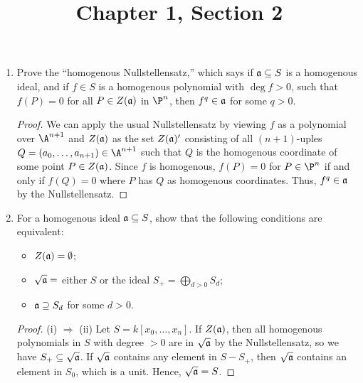 \documentclass[a4paper]{article}
\title{Chapter 1, Section 2}
\begin{document}
\maketitle

\begin{enumerate} [label=\textbf{\arabic*.}, leftmargin=0cm]

    \item[\textbf{1.}] Prove the ``homogenous Nullstellensatz,'' which says if $\mathfrak{a} \subseteq S$ is a homogenous ideal, and if $f \in S$ is a homogenous polynomial with $\deg{f} > 0$, such that $f(P) = 0$ for all $P \in Z(\mathfrak{a})$ in $\P^n$, then $f^q \in \mathfrak{a}$ for some $q > 0$.

          \begin{proof}
              We can apply the usual Nullstellensatz by viewing $f$ as a polynomial over $\A^{n + 1}$ and $Z(\mathfrak{a})$ as the set $Z(\mathfrak{a})'$ consisting of all $(n + 1)$-uples $Q = (a_0, \dots, a_{n + 1}) \in \A^{n + 1}$ such that $Q$ is the homogenous coordinate of some point $P \in Z(\mathfrak{a})$.
              Since $f$ is homogenous, $f(P) = 0$ for $P \in \P^n$ if and only if $f(Q) = 0$ where $P$ has $Q$ as homogenous coordinates.
              Thus, $f^q \in \mathfrak{a}$ by the Nullstellensatz.
          \end{proof}

    \item[\textbf{2.}] For a homogenous ideal $\mathfrak{a} \subseteq S$, show that the following conditions are equivalent:
          \begin{itemize}
              \item[(i)] $Z(\mathfrak{a}) = \emptyset$;

              \item[(ii)] $\sqrt{\mathfrak{a}} =$ either $S$ or the ideal $S_+ = \bigoplus_{d > 0} S_d$;

              \item[(iii)] $\mathfrak{a} \supseteq S_d$ for some $d > 0$.
          \end{itemize}

          \begin{proof}
              (i) $\Rightarrow$ (ii) Let $S = k[x_0, \dots, x_n]$.
              If $Z(\goth{a}) \empty$, then all homogenous polynomials in $S$ with degree $> 0$ are in $\sqrt{\mathfrak{a}}$ by the Nullstellensatz, so we have $S_+ \subseteq \sqrt{\mathfrak{a}}$.
              If $\sqrt{\mathfrak{a}}$ contains any element in $S - S_+$, then $\sqrt{\mathfrak{a}}$ contains an element in $S_0$, which is a unit.
              Hence, $\sqrt{\mathfrak{a}} = S$.


\end{proof}
\end{enumerate}
\end{document}

